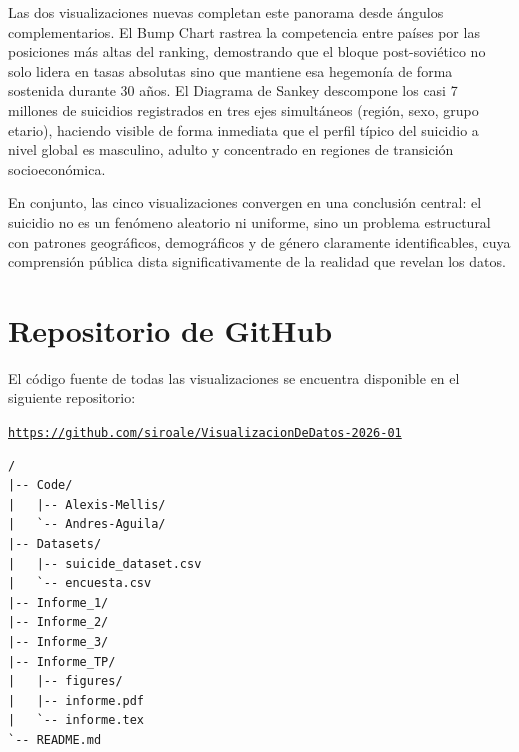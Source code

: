 \documentclass[12pt, letterpaper]{article}
\begin{document}
Las dos visualizaciones nuevas completan este panorama desde \'angulos complementarios. El Bump Chart rastrea la competencia entre pa\'ises por las posiciones m\'as altas del ranking, demostrando que el bloque post-sovi\'etico no solo lidera en tasas absolutas sino que mantiene esa hegemon\'ia de forma sostenida durante 30 a\~nos. El Diagrama de Sankey descompone los casi 7 millones de suicidios registrados en tres ejes simult\'aneos (regi\'on, sexo, grupo etario), haciendo visible de forma inmediata que el perfil t\'ipico del suicidio a nivel global es masculino, adulto y concentrado en regiones de transici\'on socioecon\'omica.

En conjunto, las cinco visualizaciones convergen en una conclusi\'on central: el suicidio no es un fen\'omeno aleatorio ni uniforme, sino un problema estructural con patrones geogr\'aficos, demogr\'aficos y de g\'enero claramente identificables, cuya comprensi\'on p\'ublica dista significativamente de la realidad que revelan los datos.

\section{Repositorio de GitHub}

El c\'odigo fuente de todas las visualizaciones se encuentra disponible en el siguiente repositorio:

\begin{center}
  \href{https://github.com/siroale/VisualizacionDeDatos-2026-01}{\texttt{https://github.com/siroale/VisualizacionDeDatos-2026-01}}
\end{center}

\begin{verbatim}
/
|-- Code/
|   |-- Alexis-Mellis/
|   `-- Andres-Aguila/
|-- Datasets/
|   |-- suicide_dataset.csv
|   `-- encuesta.csv
|-- Informe_1/
|-- Informe_2/
|-- Informe_3/
|-- Informe_TP/
|   |-- figures/
|   |-- informe.pdf
|   `-- informe.tex
`-- README.md
\end{verbatim}
\end{document}
